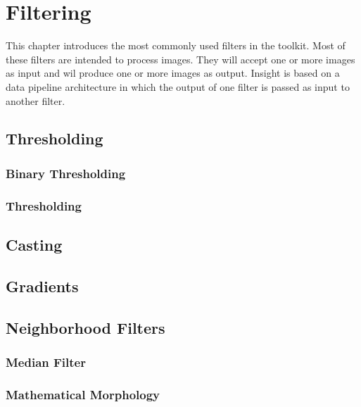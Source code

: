 \chapter{Filtering}

This chapter introduces the most commonly used filters in the toolkit.  Most of
these filters are intended to process images. They will accept one or more
images as input and wil produce one or more images as output. Insight is based
on a data pipeline architecture in which the output of one filter is passed as
input to another filter.


\section{Thresholding}
\label{sec:ThresholdingFiltering}

\subsection{Binary Thresholding}
\label{sec:BinaryThresholdingFiltering}



\subsection{Thresholding}
\label{sec:ThresholdingFiltering}





\section{Casting}
\label{sec:CastingFiltering}




\section{Gradients}
\label{sec:GradientFiltering}





\section{Neighborhood Filters}
\label{sec:NeighborhoodFilters}

\subsection{Median Filter}
\label{sec:MedianFilter}




\subsection{Mathematical Morphology}
\label{sec:MathematicalMorphology}


